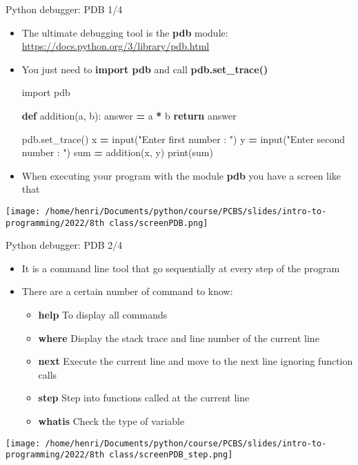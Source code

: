 \documentclass[
  8pt,
  ignorenonframetext,
]{beamer}
\newenvironment{Shaded}{\begin{snugshade}}{\end{snugshade}}
\newcommand{\BuiltInTok}[1]{#1}
\newcommand{\ControlFlowTok}[1]{\textcolor[rgb]{0.13,0.29,0.53}{\textbf{#1}}}
\newcommand{\ImportTok}[1]{#1}
\newcommand{\KeywordTok}[1]{\textcolor[rgb]{0.13,0.29,0.53}{\textbf{#1}}}
\newcommand{\NormalTok}[1]{#1}
\newcommand{\OperatorTok}[1]{\textcolor[rgb]{0.81,0.36,0.00}{\textbf{#1}}}
\newcommand{\StringTok}[1]{\textcolor[rgb]{0.31,0.60,0.02}{#1}}
\providecommand{\tightlist}{%
  \setlength{\itemsep}{0pt}\setlength{\parskip}{0pt}}
\begin{document}
\begin{frame}[fragile]{Python debugger: PDB 1/4}
\protect\hypertarget{python-debugger-pdb-14}{}
\begin{itemize}
\item
  The ultimate debugging tool is the \textbf{pdb} module:
  \url{https://docs.python.org/3/library/pdb.html}
\item
  You just need to \textbf{import pdb} and call
  \textbf{pdb.set\_trace()}

\begin{Shaded}
\begin{Highlighting}[]
\ImportTok{import}\NormalTok{ pdb}

\KeywordTok{def}\NormalTok{ addition(a, b):}
\NormalTok{    answer }\OperatorTok{=}\NormalTok{ a }\OperatorTok{*}\NormalTok{ b}
    \ControlFlowTok{return}\NormalTok{ answer}

\NormalTok{pdb.set\_trace()}
\NormalTok{x }\OperatorTok{=} \BuiltInTok{input}\NormalTok{(}\StringTok{"Enter first number : "}\NormalTok{)}
\NormalTok{y }\OperatorTok{=} \BuiltInTok{input}\NormalTok{(}\StringTok{"Enter second number : "}\NormalTok{)}
\BuiltInTok{sum} \OperatorTok{=}\NormalTok{ addition(x, y)}
\BuiltInTok{print}\NormalTok{(}\BuiltInTok{sum}\NormalTok{)}
\end{Highlighting}
\end{Shaded}
\item
  When executing your program with the module \textbf{pdb} you have a
  screen like that
\end{itemize}

\texttt{[image: /home/henri/Documents/python/course/PCBS/slides/intro-to-programming/2022/8th class/screenPDB.png]}
\end{frame}

\begin{frame}{Python debugger: PDB 2/4}
\protect\hypertarget{python-debugger-pdb-24}{}
\begin{itemize}
\item
  It is a command line tool that go sequentially at every step of the
  program
\item
  There are a certain number of command to know:

  \begin{itemize}
  \tightlist
  \item
    \textbf{help} To display all commands
  \item
    \textbf{where} Display the stack trace and line number of the
    current line
  \item
    \textbf{next} Execute the current line and move to the next line
    ignoring function calls
  \item
    \textbf{step} Step into functions called at the current line
  \item
    \textbf{whatis} Check the type of variable
  \end{itemize}
\end{itemize}

\texttt{[image: /home/henri/Documents/python/course/PCBS/slides/intro-to-programming/2022/8th class/screenPDB\_step.png]}
\end{frame}
\end{document}
